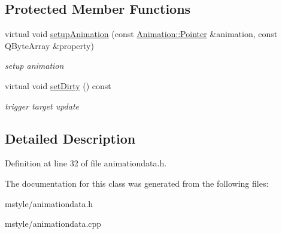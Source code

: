 \subsection*{Protected Member Functions}
\begin{DoxyCompactItemize}
\item 
\mbox{\label{class_animation_data_a1681c267669d2f2d512b3ccd51e6f0ae}} 
virtual void \hyperlink{class_animation_data_a1681c267669d2f2d512b3ccd51e6f0ae}{setup\+Animation} (const \hyperlink{class_animation_ac48a8d074abd43dc3f6485353ba24e30}{Animation\+::\+Pointer} \&animation, const Q\+Byte\+Array \&property)
\begin{DoxyCompactList}\small\item\em setup animation \end{DoxyCompactList}\item 
\mbox{\label{class_animation_data_a9594be7903fbe8588cfc3a412fd6ffb9}} 
virtual void \hyperlink{class_animation_data_a9594be7903fbe8588cfc3a412fd6ffb9}{set\+Dirty} () const
\begin{DoxyCompactList}\small\item\em trigger target update \end{DoxyCompactList}\end{DoxyCompactItemize}


\subsection{Detailed Description}


Definition at line 32 of file animationdata.\+h.



The documentation for this class was generated from the following files\+:\begin{DoxyCompactItemize}
\item 
mstyle/animationdata.\+h\item 
mstyle/animationdata.\+cpp\end{DoxyCompactItemize}
